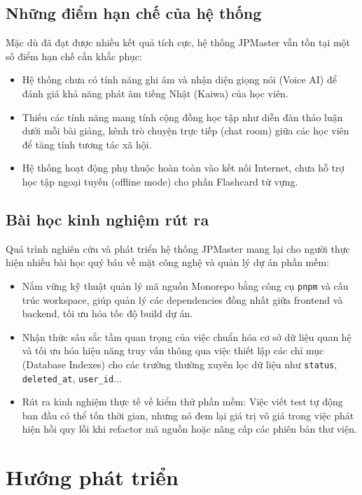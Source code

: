 \documentclass[../DoAn.tex]{subfiles}
\begin{document}
\subsection{Những điểm hạn chế của hệ thống}
Mặc dù đã đạt được nhiều kết quả tích cực, hệ thống JPMaster vẫn tồn tại một số điểm hạn chế cần khắc phục:
\begin{itemize}
    \item Hệ thống chưa có tính năng ghi âm và nhận diện giọng nói (Voice AI) để đánh giá khả năng phát âm tiếng Nhật (Kaiwa) của học viên.
    \item Thiếu các tính năng mang tính cộng đồng học tập như diễn đàn thảo luận dưới mỗi bài giảng, kênh trò chuyện trực tiếp (chat room) giữa các học viên để tăng tính tương tác xã hội.
    \item Hệ thống hoạt động phụ thuộc hoàn toàn vào kết nối Internet, chưa hỗ trợ học tập ngoại tuyến (offline mode) cho phần Flashcard từ vựng.
\end{itemize}

\subsection{Bài học kinh nghiệm rút ra}
Quá trình nghiên cứu và phát triển hệ thống JPMaster mang lại cho người thực hiện nhiều bài học quý báu về mặt công nghệ và quản lý dự án phần mềm:
\begin{itemize}
    \item Nắm vững kỹ thuật quản lý mã nguồn Monorepo bằng công cụ \texttt{pnpm} và cấu trúc workspace, giúp quản lý các dependencies đồng nhất giữa frontend và backend, tối ưu hóa tốc độ build dự án.
    \item Nhận thức sâu sắc tầm quan trọng của việc chuẩn hóa cơ sở dữ liệu quan hệ và tối ưu hóa hiệu năng truy vấn thông qua việc thiết lập các chỉ mục (Database Indexes) cho các trường thường xuyên lọc dữ liệu như \texttt{status}, \texttt{deleted\_at}, \texttt{user\_id}...
    \item Rút ra kinh nghiệm thực tế về kiểm thử phần mềm: Việc viết test tự động ban đầu có thể tốn thời gian, nhưng nó đem lại giá trị vô giá trong việc phát hiện hồi quy lỗi khi refactor mã nguồn hoặc nâng cấp các phiên bản thư viện.
\end{itemize}

\section{Hướng phát triển}
\end{document}

